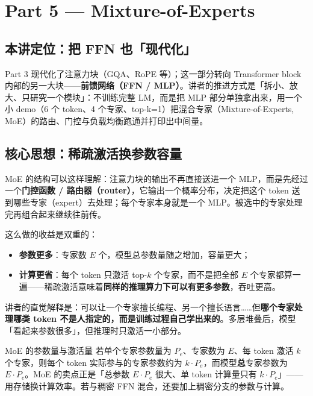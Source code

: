 \section{Part 5 — Mixture-of-Experts}

\subsection{本讲定位：把 FFN 也「现代化」}

Part 3 现代化了注意力块（GQA、RoPE 等）；这一部分转向 Transformer block 内部的另一大块——\textbf{前馈网络（FFN / MLP）}。讲者的推进方式是「拆小、放大、只研究一个模块」：不训练完整 LM，而是把 MLP 部分单独拿出来，用一个小 demo（6 个 token、4 个专家、top-k=1）把混合专家（Mixture-of-Experts, MoE）的路由、门控与负载均衡跑通并打印出中间量。

\subsection{核心思想：稀疏激活换参数容量}

MoE 的结构可以这样理解：注意力块的输出不再直接送进一个 MLP，而是先经过一个\textbf{门控函数 / 路由器（router）}，它输出一个概率分布，决定把这个 token 送到哪些专家（expert）去处理；每个专家本身就是一个 MLP。被选中的专家处理完再组合起来继续往前传。

这么做的收益是双重的：

\begin{itemize}
\item \textbf{参数更多}：专家数 $E$ 个，模型总参数量随之增加，容量更大；
\item \textbf{计算更省}：每个 token 只激活 top-$k$ 个专家，而不是把全部 $E$ 个专家都算一遍——稀疏激活意味着\textbf{同样的推理算力下可以有更多参数}，吞吐更高。
\end{itemize}

讲者的直觉解释是：可以让一个专家擅长编程、另一个擅长语言……但\textbf{哪个专家处理哪类 token 不是人指定的，而是训练过程自己学出来的}。多层堆叠后，模型「看起来参数很多」，但推理时只激活一小部分。

\begin{knowledgebox}{MoE 的参数量与激活量}
若单个专家参数量为 $P_e$、专家数为 $E$、每 token 激活 $k$ 个专家，则每个 token 实际参与的专家参数约为 $k\cdot P_e$，而模型\textbf{总}专家参数为 $E\cdot P_e$。MoE 的卖点正是「总参数 $E\cdot P_e$ 很大、单 token 计算量只有 $k\cdot P_e$」——用存储换计算效率。若与稠密 FFN 混合，还要加上稠密分支的参数与计算。
\end{knowledgebox}

